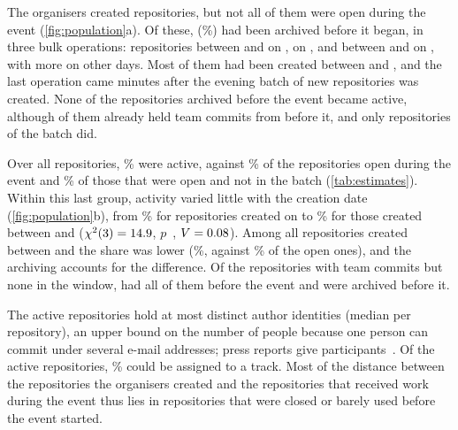 \documentclass{article}
\begin{document}
The organisers created \NRqOneTotal{} repositories, but not all of them were open during the event (\cref{fig:population}a). Of these, \NRqOnePrearchivedN{} (\NRqOnePrearchivedPct\%) had been archived before it began, in three bulk operations: \NRqOnePrearchivedClustersSepOneFiveN{} repositories between \NRqOnePrearchivedClustersSepOneFiveFirst{} and \NRqOnePrearchivedClustersSepOneFiveLast{} on \sepfifteen, \NRqOnePrearchivedClustersSepOneSevenN{} on \sepseventeen{}, and \NRqOnePrearchivedClustersSepTwoTwoN{} between \NRqOnePrearchivedClustersSepTwoTwoFirst{} and \NRqOnePrearchivedClustersSepTwoTwoLast{} on \batchday{}, with \NRqOnePrearchivedOther{} more on other days. Most of them had been created between \sepfifteen{} and \septwentyone{}, and the last operation came minutes after the evening batch of \NRqOneBatchN{} new repositories was created. None of the repositories archived before the event became active, although \NRqOnePrearchivedWithCommits{} of them already held team commits from before it, and only \NRqOneBatchActiveN{} repositories of the batch did.

Over all repositories, \NRqOneActivePct\% were active, against \NRqOneActiveOfOpenPct\% of the \NRqOneOpenN{} repositories open during the event and \NRqOneActiveOfOpenNonbatchPct\% of those that were open and not in the batch (\cref{tab:estimates}). Within this last group, activity varied little with the creation date (\cref{fig:population}b), from \NRqOneCreationSepTwoTwoOpenPct\% for repositories created on \batchday{} to \NRqOneCreationSepZeroOneOneFourOpenPct\% for those created between \sepone{} and \seponefour{} ($\chi^2(\num{3}) = \num{14.9}$, $p$~\NRqOneCreationChiTwoOpenNonbatchP, $V = \num{0.08}$). Among all repositories created between \sepfifteen{} and \septwentyone{} the share was lower (\NRqOneCreationSepOneFiveTwoOneAllPct\%, against \NRqOneCreationSepOneFiveTwoOneOpenPct\% of the open ones), and the archiving accounts for the difference. Of the \NRqOneOutsideOnlyN{} repositories with team commits but none in the window, \NRqOneOutsideOnlyAllBeforeEvent{} had all of them before the event and \NRqOneOutsideOnlyPrearchived{} were archived before it.

The active repositories hold at most \NRqOneAuthorsSum{} distinct author identities (median \NRqOneAuthorsMedian{} per repository), an upper bound on the number of people because one person can commit under several e-mail addresses; press reports give \participantsreported{} participants~\cite{astanatimes2026guinness}. Of the active repositories, \NRqOneMatchedTrackPct\% could be assigned to a track. Most of the distance between the repositories the organisers created and the repositories that received work during the event thus lies in repositories that were closed or barely used before the event started.
\end{document}
